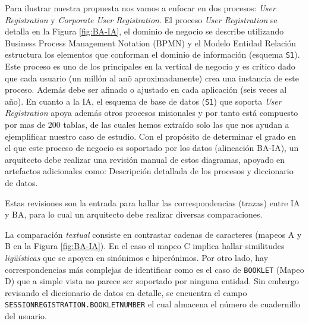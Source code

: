 Para ilustrar nuestra propuesta nos vamos a enfocar en dos procesos: \textit{User Registration} y \textit{Corporate User Registration}. El proceso \textit{User Registration} se detalla en la Figura \ref{fig:BA-IA}, el dominio de negocio se describe utilizando Business Process Management Notation (BPMN) y el Modelo Entidad Relaci\'on estructura los elementos que conforman el dominio de informaci\'on (esquema \texttt{S1}). Este proceso es uno de los principales en la vertical de negocio y es cr\'itico dado que cada usuario (un mill\'on al an\~o aproximadamente) crea una instancia de este proceso. Adem\'as debe ser afinado o ajustado en cada aplicaci\'on (seis veces al a\~no). En cuanto a la IA, el esquema de base de datos (\texttt{S1}) que soporta \textit{User Registration} apoya adem\'as otros procesos misionales y por tanto est\'a compuesto por mas de 200 tablas, de las cuales hemos extra\'ido solo las que nos ayudan a ejemplificar nuestro caso de estudio. Con el prop\'osito de determinar el grado en el que este proceso de negocio es soportado por los datos (alineaci\'on BA-IA), un arquitecto debe realizar una revisi\'on manual de estos diagramas, apoyado en artefactos adicionales como: Descripci\'on detallada de los procesos y diccionario de datos. 

Estas revisiones son la entrada para hallar las correspondencias (trazas) entre IA y BA, para lo cual un arquitecto debe realizar diversas comparaciones.

La comparaci\'on \textit{textual} consiste en contrastar cadenas de caracteres (mapeos A y B en la Figura \ref{fig:BA-IA}). En el caso el mapeo C implica hallar similitudes \textit{lig\"u\'isticas} que se apoyen en sin\'onimos e hiper\'onimos. Por otro lado, hay correspondencias m\'as complejas de identificar como es el caso de \texttt{BOOKLET} (Mapeo D) que a simple vista no parece ser soportado por ninguna entidad. Sin embargo revisando el diccionario de datos en detalle, se encuentra el campo \texttt{SESSIONREGISTRATION.BOOKLETNUMBER} el cual almacena el n\'umero de cuadernillo del usuario. 

